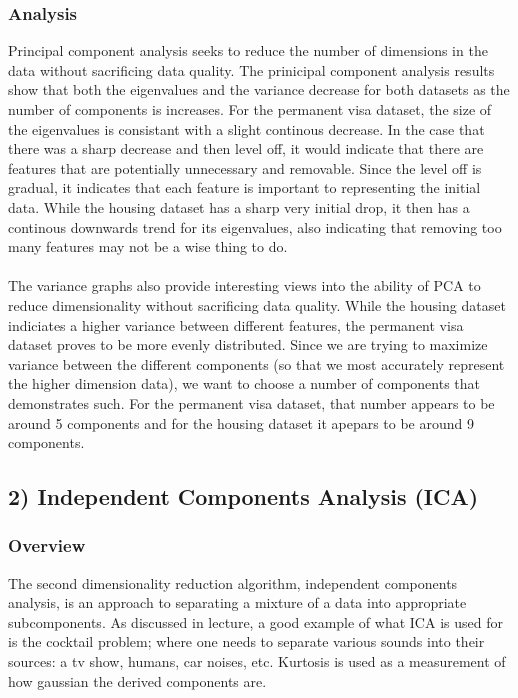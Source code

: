 \documentclass[h]{article}
\begin{document}
\subsubsection*{Analysis}
Principal component analysis seeks to reduce the number of dimensions in the data without sacrificing data quality.  The prinicipal component analysis results show that both the eigenvalues and the variance decrease for 
both datasets as the number of components is increases.  For the permanent visa 
dataset, the size of the eigenvalues is consistant with a slight continous decrease.  In the case that there was a sharp decrease and then level off,
it would indicate that there are features that are potentially unnecessary and removable.  Since the level off is gradual, 
it indicates that each feature is important to representing the initial data.  While the housing 
dataset has a sharp very initial drop, it then has a continous downwards trend for its eigenvalues, 
also indicating that removing too many features may not be a wise thing to do.
\\ \\
The variance graphs also provide interesting views into the ability of PCA to reduce 
dimensionality without sacrificing data quality.  While the housing dataset 
indiciates a higher variance between different features, the permanent visa 
dataset proves to be more evenly distributed.  Since we are trying to maximize 
variance between the different components (so that we most accurately represent the higher dimension 
data), we want to choose a number of components that demonstrates such.  For 
the permanent visa dataset, that number appears to be around 5 components and for 
the housing dataset it apepars to be around 9 components.

\subsection*{2) Independent Components Analysis (ICA)}  
\subsubsection*{Overview}
The second dimensionality reduction algorithm, independent components analysis, 
is an approach to separating a mixture of a data into appropriate subcomponents. 
 As discussed in lecture, a good example of what ICA is used for is the cocktail problem; where one needs to 
 separate various sounds into their sources: a tv show, humans, car noises, etc.  
  Kurtosis is used as a measurement of how gaussian the derived components 
  are.
  
\end{document}
